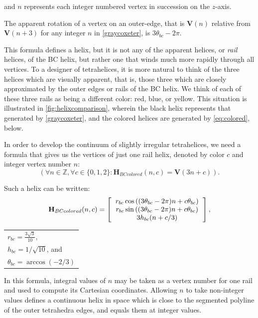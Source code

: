 \documentclass[twocolumn,10pt]{asme2ej}
\renewcommand{\vec}[1]{\mathbf{#1}}
\begin{document}
and $n$ represents each integer numbered vertex in succession on the $z$-axis.

The apparent rotation of a vertex on an outer-edge, that is $\vec{V}(n)$ relative from $\vec{V}(n+3)$
for any integer $n$
in \cref{graycoxeter}, is $3 \theta_{bc} - 2\pi$.

This formula defines a helix, but it is not any of the apparent helices, or \emph{rail} helices, of the
BC helix, but rather one that winds much more rapidly through all
vertices. To a designer of tetrahelices, it is more natural to think of
the three helices which are visually apparent, that is, those three
which are closely approximated by the outer edges or rails of
the BC helix. We think of each of these three rails as being a different color: red, blue, or yellow.
This situation is illustrated in \cref{fig:helixcomparison}, wherein the black helix represents that
generated by \cref{graycoxeter},
and the colored helices are generated by \cref{eq:colored}, below. 



In order to develop the continuum of slightly irregular tetrahelices,
we need a formula that gives us the vertices of just
one rail helix, denoted by color $c$ and integer vertex number $n$:
\[
(\forall n \in \mathbb{Z}, \forall c \in \{0,1,2\} : \vec{H}_{BCcolored}(n,c) = \vec{V}(3n +c)) .
\]

Such a helix can be written:
\begin{equation}
  \label{eq:colored}
 \vec{H}_{BCcolored}(n,c) =
\left [
  \begin{tabular}{c}
   $ r_{bc}  \cos{((3 \theta_{bc} - 2 \pi)n + c  \theta_{bc})}  $\\
   $ r_{bc} \sin{((3 \theta_{bc} - 2 \pi)n + c  \theta_{bc})} $\\
   $ 3 h_{bc} (n + c/3)  $
  \end{tabular}
  \right ],
\end{equation}
  \begin{tabular}{l}
 $ r_{bc} = \frac{3\sqrt{3}}{10} $,\\
 $ h_{bc} = 1/\sqrt{10} $, and \\
 $ \theta_{bc} = \arccos(-2/3) $ \text{.}\\
  \end{tabular}      

In this formula, integral values of $n$ may be taken as a vertex number for one rail and used to compute
its Cartesian
coordinates. Allowing $n$ to take non-integer values defines a continuous
helix in space which is close to the segmented polyline of the outer
tetrahedra edges, and equals them at integer
values.
\end{document}
